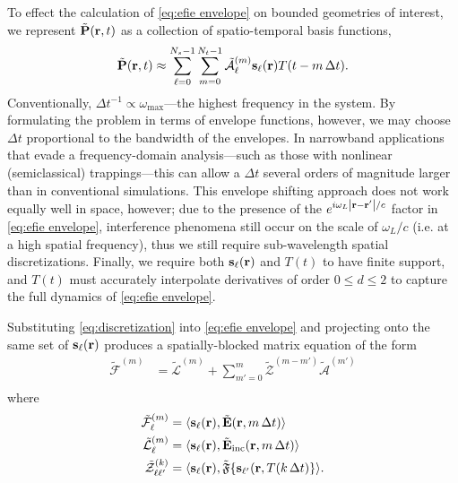 To effect the calculation of \cref{eq:efie envelope} on bounded geometries of interest, we represent $\tilde{\vb{P}}(\vb{r}, t)$ as a collection of spatio-temporal basis functions,
\begin{equation}
  \tilde{\vb{P}}(\vb{r}, t) \approx \sum_{\ell = 0}^{N_s - 1} \sum_{m = 0}^{N_t - 1} \tilde{\mathcal{A}}_\ell^{(m)} \vb{s}_\ell(\vb{r}) T(t - m \, \Delta t).
  \label{eq:discretization}
\end{equation}
Conventionally, $\Delta t^{-1} \propto \omega_\text{max}$---the highest frequency in the system.
By formulating the problem in terms of envelope functions, however, we may choose $\Delta t$ proportional to the bandwidth of the envelopes.
In narrowband applications that evade a frequency-domain analysis---such as those with nonlinear (semiclassical) trappings---this can allow a $\Delta t$ several orders of magnitude larger than in conventional simulations.
This envelope shifting approach does not work equally well in space, however; due to the presence of the $e^{i \omega_L \abs{\vb{r} - \vb{r}'}/c}$ factor in \cref{eq:efie envelope}, interference phenomena still occur on the scale of $\omega_L/c$ (i.e. at a high spatial frequency), thus we still require sub-wavelength spatial discretizations.
Finally, we require both $\vb{s}_\ell(\vb{r})$ and $T(t)$ to have finite support, and $T(t)$ must accurately interpolate derivatives of order $0 \leqslant d \leqslant 2$ to capture the full dynamics of \cref{eq:efie envelope}.

Substituting \cref{eq:discretization} into \cref{eq:efie envelope} and projecting onto the same set of $\vb{s}_\ell(\vb{r})$ produces a spatially-blocked matrix equation of the form
\begin{equation}
  \begin{aligned}
    \tilde{\mathcal{F}}^{(m)} &= \tilde{\mathcal{L}}^{(m)} + \sum_{m'= 0}^m \tilde{\mathcal{Z}}^{(m - m')} \tilde{\mathcal{A}}^{(m')} \\
  \end{aligned}
  \label{eq:mot}
\end{equation}
where
\begin{subequations}
  \begin{align}
    \tilde{\mathcal{F}}^{(m)}_\ell &= \langle \vb{s}_\ell(\vb{r}), \tilde{\vb{E}}(\vb{r}, m \, \Delta t) \rangle \\
    \tilde{\mathcal{L}}^{(m)}_\ell &= \langle \vb{s}_\ell(\vb{r}), \tilde{\vb{E}}_\text{inc}(\vb{r}, m \, \Delta t) \rangle \\
    \tilde{\mathcal{Z}}^{(k)}_{\ell\ell'} &= \langle \vb{s}_\ell(\vb{r}), \tilde{\mathfrak{F}}\qty{\vb{s}_{\ell'}(\vb{r}, T(k \, \Delta t)} \rangle.
  \end{align}
\end{subequations}

